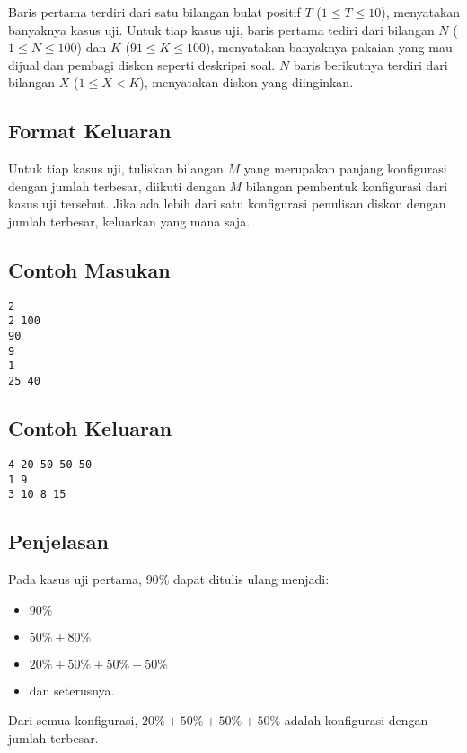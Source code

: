 \documentclass{article}
\begin{document}
Baris pertama terdiri dari satu bilangan bulat positif $T$ ($1 \leq T \leq 10$), menyatakan banyaknya kasus uji.
Untuk tiap kasus uji, baris pertama tediri dari bilangan $N$ ($1 \leq N \leq 100$) dan $K$ ($91 \leq K \leq 100$), menyatakan banyaknya pakaian yang mau dijual dan pembagi diskon seperti deskripsi soal.
$N$ baris berikutnya terdiri dari bilangan $X$ ($1 \leq X < K$), menyatakan diskon yang diinginkan.

\subsection*{Format Keluaran}

Untuk tiap kasus uji, tuliskan bilangan $M$ yang merupakan panjang konfigurasi dengan jumlah terbesar, diikuti dengan $M$ bilangan pembentuk konfigurasi dari kasus uji tersebut.
Jika ada lebih dari satu konfigurasi penulisan diskon dengan jumlah terbesar, keluarkan yang mana saja.
\\

\begin{multicols}{2}
\subsection*{Contoh Masukan}
\begin{lstlisting}
2
2 100
90
9
1
25 40
\end{lstlisting}
\columnbreak
\subsection*{Contoh Keluaran}
\begin{lstlisting}
4 20 50 50 50
1 9
3 10 8 15
\end{lstlisting}
\vfill
\null
\end{multicols}

\subsection*{Penjelasan}
Pada kasus uji pertama, $90\%$ dapat ditulis ulang menjadi:

\begin{itemize}
    \setlength\itemsep{0pt}
    \item $90\%$
    \item $50\% + 80\%$
    \item $20\% + 50\% + 50\% + 50\%$
    \item dan seterusnya.
\end{itemize}

Dari semua konfigurasi, $20\% + 50\% + 50\% + 50\%$ adalah konfigurasi dengan jumlah terbesar.

\pagebreak
\end{document}
